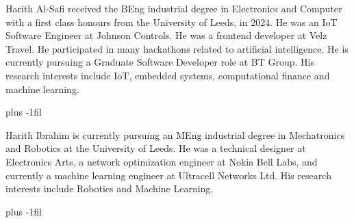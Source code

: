 \documentclass{ieeeaccess}
\begin{document}
\begin{IEEEbiography}{Harith Al-Safi} received the BEng industrial degree in Electronics and Computer with a first class honours from the University of Leeds, in 2024. He was an IoT Software Engineer at Johnson Controls. He was a frontend developer at Velz Travel.  He participated in many hackathons related to artificial intelligence. He is currently pursuing a Graduate Software Developer role at BT Group. His research interests include IoT, embedded systems, computational finance and machine learning.
\end{IEEEbiography}

\baselineskip plus -1fil

\begin{IEEEbiography}{Harith Ibrahim} is currently pursuing an MEng industrial degree in Mechatronics and Robotics at the University of Leeds. He was a technical designer at Electronics Arts, a network optimization engineer at Nokia Bell Labs, and currently a machine learning engineer at Ultracell Networks Ltd. His research interests include Robotics and Machine Learning.
\end{IEEEbiography}

\baselineskip plus -1fil
\end{document}
